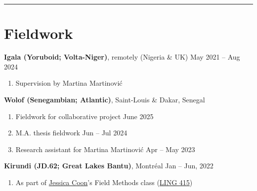 \documentclass[margin,line]{resume}
\begin{document}
\begin{resume}
\begin{comment}
	\textbf{Freelance Programmer}, Montr\'{e}al \hfill 2019 -- 2020
	\begin{enumerate}[-, leftmargin=1em, topsep=2pt]
		\item[] Web Development and Python tutoring
	\end{enumerate}

	\textbf{Junior Developer}, \href{https://gls-canada.com/en/dicom/corp/home}{GLS (\textit{fka} Dicom)}, Montr\'{e}al \hfill Jan -- May 2019
	\begin{enumerate}[-, leftmargin=1em, topsep=2pt]
		\item[] Worked on \href{https://gls-canada.com/en/dicom/about-us/news/dicom-launches-smart4-shipping}{smart4 shipping platform} back-end
	\end{enumerate}
	\end{comment}

	\vspace{-0.9em}\rule{\textwidth}{0.4pt}





		\vspace{-0.5em}

		\section{\mysidestyle Fieldwork}

		\textbf{Igala (Yoruboid; Volta-Niger)}, remotely (Nigeria \& UK) \hfill May 2021 -- Aug 2024
		\begin{enumerate}[-, leftmargin=1em, topsep=2pt]
			\item[] Supervision by Martina Martinović
		\end{enumerate}
	
	
		\textbf{Wolof (Senegambian; Atlantic)}, Saint-Louis \& Dakar, Senegal %
		\begin{enumerate}[-, leftmargin=1em, topsep=2pt]
			\item[] Fieldwork for collaborative project \hfill June 2025
			\item[] M.A. thesis fieldwork \hfill Jun -- Jul 2024
			\item[] Research assistant for Martina Martinović \hfill Apr -- May 2023
		\end{enumerate}
	
		\textbf{Kirundi (JD.62; Great Lakes Bantu)}, Montr\'{e}al \hfill Jan -- Jun, 2022
		\begin{enumerate}[-, leftmargin=1em, topsep=2pt]
			\item[] As part of \href{https://jessica.lingspace.org/}{Jessica Coon}'s Field Methods class (\href{https://www.mcgill.ca/study/2021-2022/courses/ling-415}{LING 415})
		\end{enumerate}
	

\end{resume}
\end{document}
